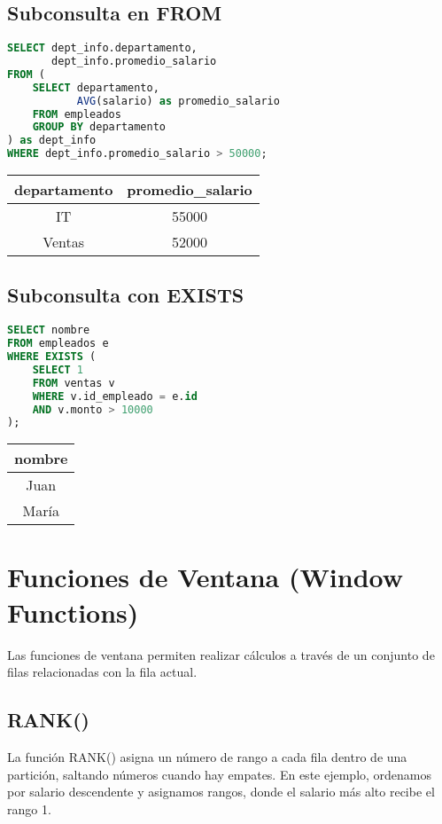 \documentclass[12pt]{article}
\begin{document}
\subsection{Subconsulta en FROM}
\begin{lstlisting}[language=SQL]
SELECT dept_info.departamento, 
       dept_info.promedio_salario
FROM (
    SELECT departamento, 
           AVG(salario) as promedio_salario
    FROM empleados
    GROUP BY departamento
) as dept_info
WHERE dept_info.promedio_salario > 50000;
\end{lstlisting}

\begin{center}
\begin{tabular}{cc}
\toprule
departamento & promedio\_salario \\
\midrule
IT & 55000 \\
Ventas & 52000 \\
\bottomrule
\end{tabular}
\end{center}

\subsection{Subconsulta con EXISTS}
\begin{lstlisting}[language=SQL]
SELECT nombre
FROM empleados e
WHERE EXISTS (
    SELECT 1 
    FROM ventas v
    WHERE v.id_empleado = e.id 
    AND v.monto > 10000
);
\end{lstlisting}

\begin{center}
\begin{tabular}{c}
\toprule
nombre \\
\midrule
Juan \\
María \\
\bottomrule
\end{tabular}
\end{center}

\section{Funciones de Ventana (Window Functions)}
Las funciones de ventana permiten realizar cálculos a través de un conjunto de filas relacionadas con la fila actual.

\subsection{RANK()}
La función RANK() asigna un número de rango a cada fila dentro de una partición, saltando números cuando hay empates. En este ejemplo, ordenamos por salario descendente y asignamos rangos, donde el salario más alto recibe el rango 1.
\end{document}
